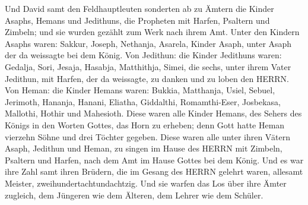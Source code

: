  Und David samt den Feldhauptleuten sonderten ab zu Ämtern
die Kinder Asaphs, Hemans und Jedithuns, die Propheten mit Harfen,
Psaltern und Zimbeln; und sie wurden gezählt zum Werk nach ihrem Amt.
 Unter den Kindern Asaphs waren: Sakkur, Joseph, Nethanja,
Asarela, Kinder Asaph, unter Asaph der da weissagte bei dem König.
 Von Jedithun: die Kinder Jedithuns waren: Gedalja, Sori,
Jesaja, Hasabja, Matthithja, Simei, die sechs, unter ihrem Vater
Jedithun, mit Harfen, der da weissagte, zu danken und zu loben den
HERRN.  Von Heman: die Kinder Hemans waren: Bukkia,
Matthanja, Usiel, Sebuel, Jerimoth, Hananja, Hanani, Eliatha, Giddalthi,
Romamthi-Eser, Josbekasa, Mallothi, Hothir und Mahesioth. 
Diese waren alle Kinder Hemans, des Sehers des Königs in den Worten
Gottes, das Horn zu erheben; denn Gott hatte Heman vierzehn Söhne und
drei Töchter gegeben.  Diese waren alle unter ihren Vätern
Asaph, Jedithun und Heman, zu singen im Hause des HERRN mit Zimbeln,
Psaltern und Harfen, nach dem Amt im Hause Gottes bei dem König.
 Und es war ihre Zahl samt ihren Brüdern, die im Gesang des
HERRN gelehrt waren, allesamt Meister, zweihundertachtundachtzig.
 Und sie warfen das Los über ihre Ämter zugleich, dem
Jüngeren wie dem Älteren, dem Lehrer wie dem Schüler.

